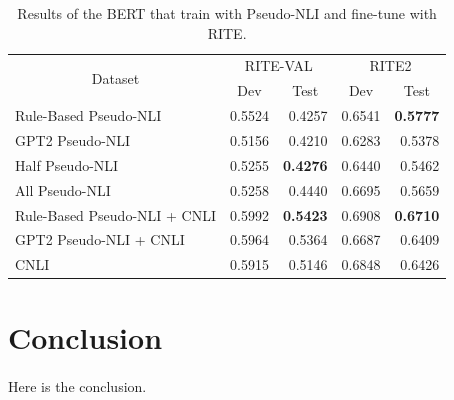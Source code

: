 \documentclass[12pt]{article}
\begin{document}
\begin{CJK*}{UTF8}{bkai}
\begin{spacing}{1.77}
\begin{table}
  \centering
  \begin{tabular}{|l|r|r|r|r|}
  \hline
  \multicolumn{1}{|c|}{\multirow{2}{*}{Dataset}} & \multicolumn{2}{c|}{RITE-VAL} & \multicolumn{2}{c|}{RITE2} \\ \cline{2-5}
  \multicolumn{1}{|c|}{} & \multicolumn{1}{c|}{Dev} & \multicolumn{1}{c|}{Test} & \multicolumn{1}{c|}{Dev} & \multicolumn{1}{c|}{Test} \\ \hline
  Rule-Based Pseudo-NLI & 0.5524 & 0.4257 & 0.6541 & \textbf{0.5777} \\ \hline
  GPT2 Pseudo-NLI & 0.5156 & 0.4210 & 0.6283 & 0.5378 \\ \hline
  Half Pseudo-NLI & 0.5255 & \textbf{0.4276} & 0.6440 & 0.5462 \\ \hline
  All Pseudo-NLI & 0.5258 & 0.4440 & 0.6695 & 0.5659 \\ \hline
  Rule-Based Pseudo-NLI + CNLI & 0.5992 & \textbf{0.5423} & 0.6908 & \textbf{0.6710} \\ \hline
  GPT2 Pseudo-NLI + CNLI & 0.5964 & 0.5364 & 0.6687 & 0.6409 \\ \hline
  CNLI & 0.5915 & 0.5146 & 0.6848 & 0.6426 \\ \hline
  \end{tabular}
  \caption{Results of the BERT that train with Pseudo-NLI and fine-tune with RITE.}
  \label{result:pseudo_nli_bert}
\end{table}

\section{Conclusion} \label{section:conclusion}
\paragraph{}
Here is the conclusion.
\end{spacing}
% 
% 
\printbibliography
\end{CJK*}
\end{document}
